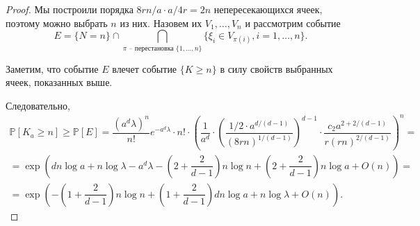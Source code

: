 \documentclass[12pt]{article}
\theoremstyle{plain}
\newtheorem{thm}{Теорема} %
\theoremstyle{definition}
\theoremstyle{remark}
\def\geq{\geqslant}
\def\leq{\leqslant}
\newcommand{\slim}{\sum\limits}
\newcommand{\PP}{\mathbb{P}}
\begin{document}
\begin{proof}
    
    Мы построили порядка $8rn/a \cdot a/4r = 2n$ непересекающихся ячеек, поэтому можно выбрать $n$ из них. Назовем их $V_1, \ldots, V_n$  и рассмотрим событие $$E = \{N=n\}\cap \bigcap\limits_{\pi \text{ -- перестановка } \{1, \ldots, n\}} \{\xi_i \in V_{\pi(i)}, i = 1, \ldots, n\}.$$
                         
    Заметим, что событие $E$ влечет событие $\{K \geq n\}$ в силу свойств выбранных ячеек, показанных выше.
  
    Следовательно, 
    \begin{multline*}
        \PP[K_a\geq n] \geq \PP[E] = \dfrac{(a^d\lambda)^n}{n!}e^{-a^d\lambda}\cdot n!
        \cdot \left(\dfrac{1}{a^d}\cdot\left(\dfrac{1/2\cdot a^{d/(d-1)}}{(8rn)^{1/(d-1)}}\right)^{d-1}\cdot
        \dfrac{c_2a^{2+ 2/(d-1)}}{r(rn)^{2/(d-1)}}\right)^n = \\
        =\exp\left(dn\log a + n\log\lambda - a^d\lambda - \left(2+\dfrac{2}{d-1}\right)n\log n + \left(2+\dfrac{2}{d-1}\right) n\log a  + O(n)\right) = \\
        =\exp\left(-\left(1+ \dfrac{2}{d-1}\right)n\log n + \left(1 + \dfrac{2}{d-1}\right)dn\log a + n\log\lambda + O(n)\right).
    \end{multline*}{}
\end{proof}{}

%
\end{document}
